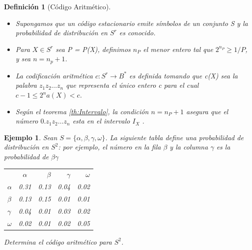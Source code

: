 \documentclass{beamer}
\theoremstyle{plain}
\newtheorem{definicion} [Definicion]{Definición}
\theoremstyle{example}
\theoremstyle{example}
\newtheorem{ejemplo} [Ejemplo] {Ejemplo}
\begin{document}
\begin{frame}  \small 

\begin{definicion}[Código Aritmético]\label{CodeA}

\begin{itemize}
\item Supongamos que un código estacionario emite símbolos de un conjunto S y la probabilidad de distribución en $S^r$ es conocido.

\item Para $X \in S^r$ sea P = P(X), definimos $n_P$ el menor entero tal que $2^{n_P} \geq 1/P$, y sea $n = n_p +1$. 
\item La codificación aritmética $c: S^r \rightarrow B^{*}$ es definida tomando que c(X) sea la palabra $z_1z_2 \ldots z_n$ que representa el único entero c para el cual $c-1 \leq 2^n a(X) < c$.

\item Según el teorema \ref{th:Intervalo}, la condición $n = n_P + 1$ asegura que el número  $0.z_1z_2 \ldots z_n$ esta en el intervalo $I_X$ .

\end{itemize}


\end{definicion}


\end{frame} 
\begin{frame}  \small 
\begin{ejemplo}

Sean $S = \{\alpha, \beta,\gamma ,\omega \}$. La siguiente tabla define una probabilidad de distribución en $S^2$: por ejemplo, el número en la fila $\beta$ y la columna $\gamma$  es la probabilidad de $\beta\gamma$

\begin{center}
 \begin{tabular}{ l c r r r}
         & $\alpha$ & $\beta$ & $\gamma$ & $\omega$\\
   $\alpha$    & 0.31 & 0.13 & 0.04 & 0.02 \\
   $\beta$      & 0.13 & 0.15 & 0.01 & 0.01\\
   $\gamma$ & 0.04 & 0.01 & 0.03 & 0.02\\
   $\omega$  & 0.02 & 0.01 & 0.02 & 0.05\\
 \end{tabular}
\end{center}

Determina el código aritmético para $S^2$.\\
\end{ejemplo}


\end{frame} 
\end{document}
